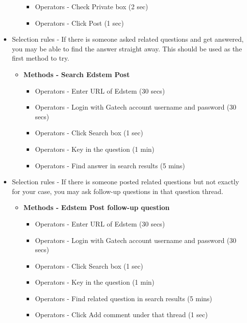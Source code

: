 \documentclass[
	letterpaper, %
]{jdf}
\begin{document}
\begin{itemize}
\begin{itemize}
\begin{itemize}
                    \item Operators - Check Private box (2 sec)
                    \item Operators - Click Post (1 sec)
                \end{itemize}
        \end{itemize}
    \item Selection rules - If there is someone asked related questions and get answered, you may be able to find the answer straight away. This should be used as the first method to try.
        \begin{itemize}
            \item \textbf{Methods - Search Edstem Post}
                \begin{itemize}
                    \item Operators - Enter URL of Edstem (30 secs)
                    \item Operators - Login with Gatech account username and password (30 secs)
                    \item Operators - Click Search box (1 sec)
                    \item Operators - Key in the question (1 min)
                    \item Operators - Find answer in search results (5 mins)
                \end{itemize}
        \end{itemize}
    \item Selection rules - If there is someone posted related questions but not exactly for your case, you may ask follow-up questions in that question thread.
        \begin{itemize}
            \item \textbf{Methods - Edstem Post follow-up question}
                \begin{itemize}
                    \item Operators - Enter URL of Edstem (30 secs)
                    \item Operators - Login with Gatech account username and password (30 secs)
                    \item Operators - Click Search box (1 sec)
                    \item Operators - Key in the question (1 min)
                    \item Operators - Find related question in search results (5 mins)
                    \item Operators - Click Add comment under that thread (1 sec)

\end{itemize}
\end{itemize}
\end{itemize}
\end{document}
